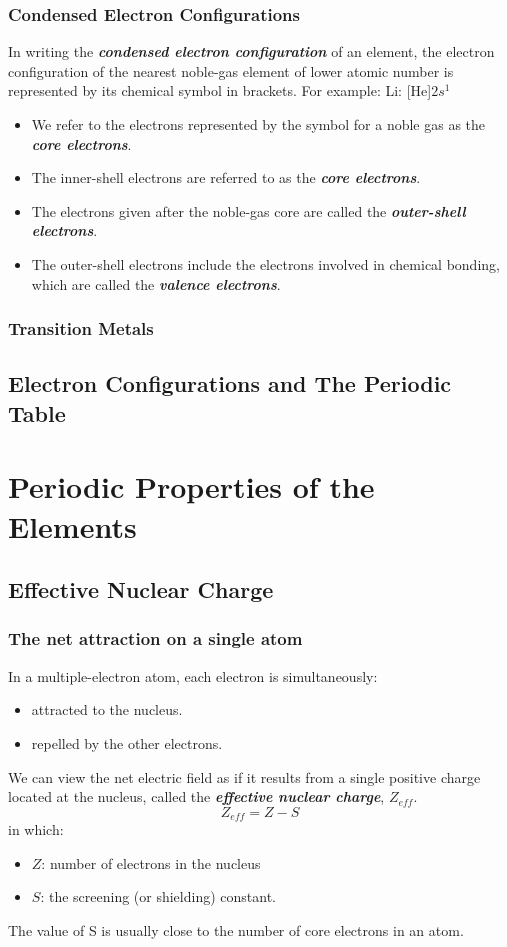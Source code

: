 \documentclass[12pt, a4paper]{report}
\newcommand{\impt}[1]{\textbf{\textit{#1}}}
\newcommand{\hi}{\section}
\newcommand{\hii}{\subsection}
\begin{document}
    \hii{Condensed Electron Configurations}
        \par In writing the \impt{condensed electron configuration} of an element, the electron
        configuration of the nearest noble-gas element of lower atomic number is represented by
        its chemical symbol in brackets. For example: Li: [He]$2s^{1}$
        \begin{itemize}
            \item We refer to the electrons represented by the symbol for a noble gas as the
                \impt{core electrons}.
            \item The inner-shell electrons are referred to as the \impt{core electrons}.
            \item The electrons given after the noble-gas core are called the \impt{outer-shell
                electrons}.
            \item The outer-shell electrons include the electrons involved in chemical bonding,
                which are called the \impt{valence electrons}.
        \end{itemize}

    \hii{Transition Metals}
        
\hi{Electron Configurations and The Periodic Table}

\chapter{Periodic Properties of the Elements}

\hi{Effective Nuclear Charge}
    \hii{The net attraction on a single atom}
        \par In a multiple-electron atom, each electron is simultaneously:
        \begin{itemize}
            \item attracted to the nucleus.
            \item repelled by the other electrons.
        \end{itemize}
        \par We can view the net electric field as if it results from a single positive charge located
        at the nucleus, called the \impt{effective nuclear charge}, $Z_{eff}$.
        \begin{equation}
            Z_{eff} = Z - S
        \end{equation}
        in which:
        \begin{itemize}
            \item $Z$: number of electrons in the nucleus
            \item $S$: the screening (or shielding) constant. 
        \end{itemize}
        \par The value of S is usually close to the number of core electrons in an atom.
\end{document}
